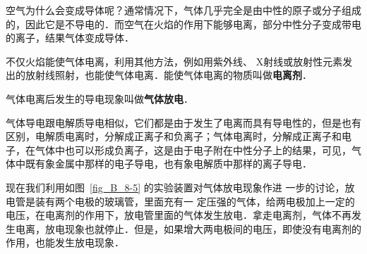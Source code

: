 空气为什么会变成导体呢？通常情况下，气体几乎完全是由中性的原子或分子组成的，因此它是不导电的．而空气在火焰的作用下能够电离，部分中性分子变成带电的离子，结果气体变成导体．

不仅火焰能使气体电离，利用其他方法，例如用紫外线、
X射线或放射性元素发出的放射线照射，也能使气体电离．能使气体电离的物质叫做\textbf{电离剂}．

气体电离后发生的导电现象叫做\textbf{气体放电}．

气体导电跟电解质导电相似，它们都是由于发生了电离而具有导电性的，但是也有区别，电解质电离时，分解成正离子和负离子；气体电离时，分解成正离子和电子，在气体中也可以形成负离子，这是由于电子附在中性分子上的结果，可见，气体中既有象金属中那样的电子导电，也有象电解质中那样的离子导电．

现在我们利用如图~\ref{fig_B_8-5} 的实验装置对气体放电现象作进
一步的讨论，放电管是装有两个电极的玻璃管，里面充有一
定压强的气体，给两电极加上一定的电压，在电离剂的作用下，放电管里面的气体发生放电．拿走电离剂，气体不再发生电离，放电现象也就停止．但是，如果增大两电极间的电压，即使没有电离剂的作用，也能发生放电现象．

